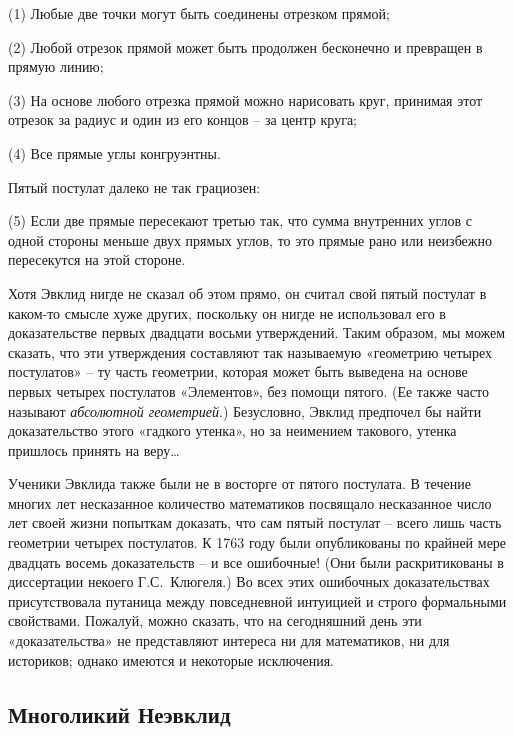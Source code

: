 \documentclass[../main.tex]{subfiles}
\begin{document}
(1) Любые две точки могут быть соединены отрезком прямой;

(2) Любой отрезок прямой может быть продолжен бесконечно и превращен в прямую линию;

(3) На основе любого отрезка прямой можно нарисовать круг, принимая этот отрезок за радиус и один из его концов \--- за центр круга;

(4) Все прямые углы конгруэнтны.

Пятый постулат далеко не так грациозен:

(5) Если две прямые пересекают третью так, что сумма внутренних углов с одной стороны меньше двух прямых углов, то это прямые рано или неизбежно пересекутся на этой стороне.

Хотя Эвклид нигде не сказал об этом прямо, он считал свой пятый постулат в каком-то смысле хуже других, поскольку он нигде не использовал его в доказательстве первых двадцати восьми утверждений. Таким образом, мы можем сказать, что эти утверждения составляют так называемую «геометрию четырех постулатов» \--- ту часть геометрии, которая может быть выведена на основе первых четырех постулатов «Элементов», без помощи пятого. (Ее также часто называют \emph{абсолютной геометрией}.) Безусловно, Эвклид предпочел бы найти доказательство этого «гадкого утенка», но за неимением такового, утенка пришлось принять на веру\ldots{}

Ученики Эвклида также были не в восторге от пятого постулата. В течение многих лет несказанное количество математиков посвящало несказанное число лет своей жизни попыткам доказать, что сам пятый постулат \--- всего лишь часть геометрии четырех постулатов. К 1763 году были опубликованы по крайней мере двадцать восемь доказательств \--- и все ошибочные! (Они были раскритикованы в диссертации некоего Г.С.~Клюгеля.) Во всех этих ошибочных доказательствах присутствовала путаница между повседневной интуицией и строго формальными свойствами. Пожалуй, можно сказать, что на сегодняшний день эти «доказательства» не представляют интереса ни для математиков, ни для историков; однако имеются и некоторые исключения.


\subsection{Многоликий Неэвклид}
\end{document}
